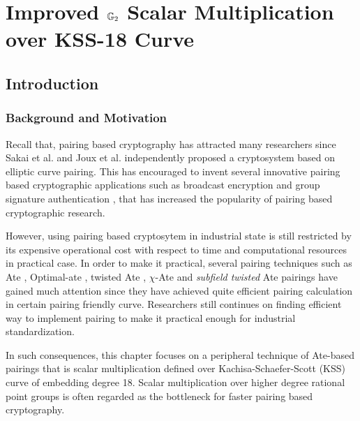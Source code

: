 

\chapter{Improved \texorpdfstring{${\mathbb{G}}_{2}$}{G2} Scalar Multiplication over KSS-18 Curve} 
\label{Chapter_IEICE}
\section{Introduction}
\subsection{Background and Motivation}
Recall that, pairing based cryptography has attracted many researchers since Sakai et al. \cite{EPRINT:SakKas03} and Joux et al. \cite{JC:Joux04} independently proposed a cryptosystem based on elliptic curve pairing. This has encouraged to invent several innovative pairing based cryptographic applications such as broadcast encryption \cite{C:BonGenWat05} and group signature authentication \cite{C:BonBoySha04}, that has increased the popularity of pairing based cryptographic research.

However, using pairing based cryptosytem in industrial state is still restricted by its expensive operational cost with respect to time and computational resources in practical case. 
In order to make it practical, several pairing techniques such as Ate \cite{DBLP:reference/crc/2005ehcc}, Optimal-ate \cite{DBLP:journals/tit/Vercauteren10}, twisted Ate \cite{EPRINT:MKHO07}, $\chi$-Ate \cite{PAIRING:NASKM08} and \textit{subfield twisted} Ate \cite{PAIRING:DevScoDah07} pairings have gained much attention since they have achieved quite efficient pairing calculation in certain pairing friendly curve. 
Researchers still continues on finding efficient way to implement pairing to make it practical enough for industrial standardization. 

In such consequences, this chapter focuses on a peripheral technique of Ate-based pairings  that is scalar multiplication defined over Kachisa-Schaefer-Scott (KSS) curve \cite{EPRINT:KacSchSco07} of embedding degree 18. 
Scalar multiplication over higher degree rational point groups is often regarded as the bottleneck for faster pairing based cryptography.

